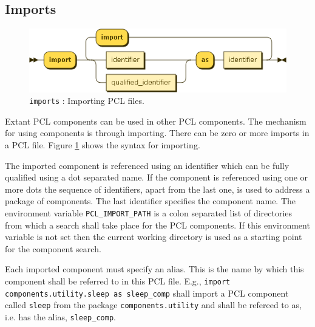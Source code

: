 \subsection{Imports}\label{subsec:imports}
\begin{figure}[h!]
  \centering
    \includegraphics[scale=\DiagramScale]{chapters/compiler/diagrams/imports}
  \caption{\texttt{imports} : Importing PCL files.}
  \label{fig:pcl-imports}
\end{figure}
Extant PCL components can be used in other PCL components. The mechanism for using components is through importing. There can be zero or more imports in a PCL file. Figure \ref{fig:pcl-imports} shows the syntax for importing.

The imported component is referenced using an identifier which can be fully qualified using a dot separated name. If the component is referenced using one or more dots the sequence of identifiers, apart from the last one, is used to address a package of components. The last identifier specifies the component name. The environment variable \texttt{PCL\_IMPORT\_PATH} is a colon separated list of directories from which a search shall take place for the PCL components. If this environment variable is not set then the current working directory is used as a starting point for the component search.

Each imported component must specify an alias. This is the name by which this component shall be referred to in this PCL file. E.g., \texttt{import components.utility.sleep as sleep\_comp} shall import a PCL component called \texttt{sleep} from the package \texttt{components.utility} and shall be refereed to as, i.e. has the alias, \texttt{sleep\_comp}.

